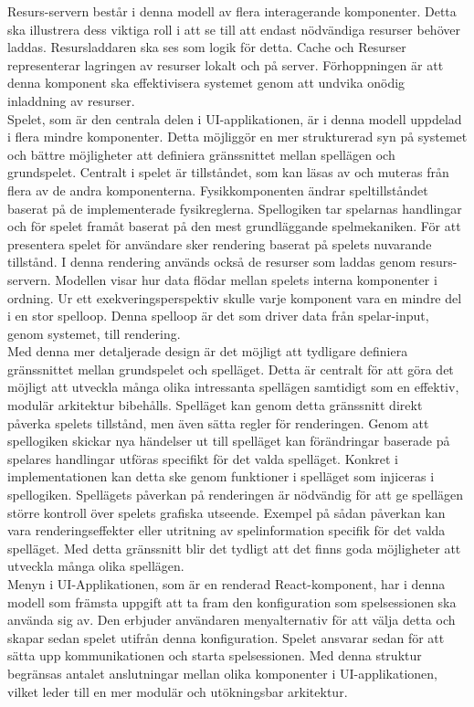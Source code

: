 Resurs-servern består i denna modell av flera interagerande komponenter. Detta ska illustrera dess viktiga roll i att se till att endast nödvändiga resurser behöver laddas. Resursladdaren ska ses som logik för detta. Cache och Resurser representerar lagringen av resurser lokalt och på server. Förhoppningen är att denna komponent ska effektivisera systemet genom att undvika onödig inladdning av resurser.\\

Spelet, som är den centrala delen i UI-applikationen, är i denna modell uppdelad i flera mindre komponenter. Detta möjliggör en mer strukturerad syn på systemet och bättre möjligheter att definiera gränssnittet mellan spellägen och grundspelet. Centralt i spelet är tillståndet, som kan läsas av och muteras från flera av de andra komponenterna. Fysikkomponenten ändrar speltillståndet baserat på de implementerade fysikreglerna. Spellogiken tar spelarnas handlingar och för spelet framåt baserat på den mest grundläggande spelmekaniken. För att presentera spelet för användare sker rendering baserat på spelets nuvarande tillstånd. I denna rendering används också de resurser som laddas genom resurs-servern. Modellen visar hur data flödar mellan spelets interna komponenter i ordning. Ur ett exekveringsperspektiv skulle varje komponent vara en mindre del i en stor spelloop. Denna spelloop är det som driver data från spelar-input, genom systemet, till rendering.\\

Med denna mer detaljerade design är det möjligt att tydligare definiera gränssnittet mellan grundspelet och spelläget. Detta är centralt för att göra det möjligt att utveckla många olika intressanta spellägen samtidigt som en effektiv, modulär arkitektur bibehålls. Spelläget kan genom detta gränssnitt direkt påverka spelets tillstånd, men även sätta regler för renderingen. Genom att spellogiken skickar nya händelser ut till spelläget kan förändringar baserade på spelares handlingar utföras specifikt för det valda spelläget. Konkret i implementationen kan detta ske genom funktioner i spelläget som injiceras i spellogiken. Spellägets påverkan på renderingen är nödvändig för att ge spellägen större kontroll över spelets grafiska utseende. Exempel på sådan påverkan kan vara renderingseffekter eller utritning av spelinformation specifik för det valda spelläget. Med detta gränssnitt blir det tydligt att det finns goda möjligheter att utveckla många olika spellägen.\\

Menyn i UI-Applikationen, som är en renderad React-komponent, har i denna modell som främsta uppgift att ta fram den konfiguration som spelsessionen ska använda sig av. Den erbjuder användaren menyalternativ för att välja detta och skapar sedan spelet utifrån denna konfiguration. Spelet ansvarar sedan för att sätta upp kommunikationen och starta spelsessionen. Med denna struktur begränsas antalet anslutningar mellan olika komponenter i UI-applikationen, vilket leder till en mer modulär och utökningsbar arkitektur.\\

